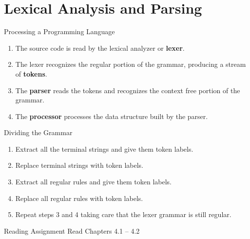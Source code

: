 \documentclass[handout]{beamer}
\begin{document}
\section {Lexical Analysis and Parsing}
\begin{frame}{Processing a Programming Language}

\vspace{1cm}
\begin{enumerate}
    \item The source code is read by the lexical analyzer or {\bf lexer}.
    \item The lexer recognizes the regular portion of the grammar, producing a stream of {\bf tokens}.
    \item The {\bf parser} reads the tokens and recognizes the context free portion of the grammar.
    \item The {\bf processor} processes the data structure built by the parser.
\end{enumerate}
\end{frame}

\begin{frame}{Dividing the Grammar}
    \begin{enumerate}
        \item Extract all the terminal strings and give them token labels.
        \item Replace terminal strings with token labels.
        \item Extract all regular rules and give them token labels.
        \item Replace all regular rules with token labels.
        \item Repeat steps 3 and 4 taking care that the lexer grammar is still regular.
    \end{enumerate}
\end{frame}

\begin{frame}{Reading Assignment}
    Read Chapters 4.1 -- 4.2
\end{frame}
\end{document}
